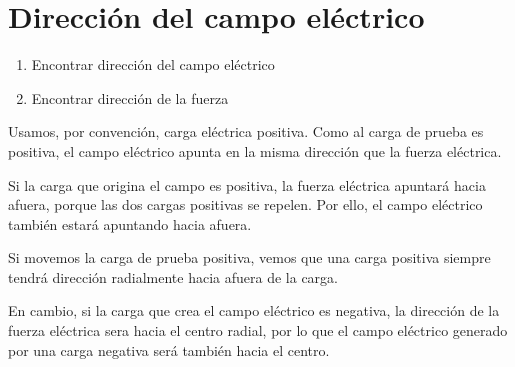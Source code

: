 \section{Dirección del campo eléctrico}

\begin{enumerate}
    \item Encontrar dirección del campo eléctrico
    \item Encontrar dirección de la fuerza
\end{enumerate}

Usamos,
por convención,
carga eléctrica positiva.
Como al carga de prueba es positiva,
el campo eléctrico apunta en la misma dirección que la fuerza eléctrica.

Si la carga que origina el campo es positiva,
la fuerza eléctrica apuntará hacia afuera,
porque las dos cargas positivas se repelen.
Por ello,
el campo eléctrico también estará apuntando hacia afuera.

Si movemos la carga de prueba positiva,
vemos que una carga positiva siempre tendrá dirección radialmente hacia afuera de la carga.

En cambio,
si la carga que crea el campo eléctrico es negativa,
la dirección de la fuerza eléctrica sera hacia el centro radial,
por lo que el campo eléctrico generado por una carga negativa será también hacia el centro.

